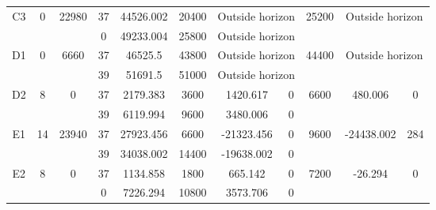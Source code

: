 \begin{table}
\begin{tabular}{c||c|c||c|c|c|c|c||c|c|c}
         &
        
      \\
      \hline
      \multirow{2}{*}{C3} &
      \multirow{2}{*}{0} &
      \multirow{2}{*}{22980} &
      37 &
      44526.002 &
      20400 &
        \multicolumn{2}{|c||}{Outside horizon} &
      \multirow{2}{*}{25200} &
        \multicolumn{2}{c}{\multirow{2}{*}{Outside horizon}}
      \\
      \cline{4-8}
       &
       &
       &
      0 &
      49233.004 &
      25800 &
        \multicolumn{2}{|c||}{Outside horizon} &
      
        
      \\
      \hline
      \multirow{2}{*}{D1} &
      \multirow{2}{*}{0} &
      \multirow{2}{*}{6660} &
      37 &
      46525.5 &
      43800 &
        \multicolumn{2}{|c||}{Outside horizon} &
      \multirow{2}{*}{44400} &
        \multicolumn{2}{c}{\multirow{2}{*}{Outside horizon}}
      \\
      \cline{4-8}
       &
       &
       &
      39 &
      51691.5 &
      51000 &
        \multicolumn{2}{|c||}{Outside horizon} &
      
        
      \\
      \hline
      \multirow{2}{*}{D2} &
      \multirow{2}{*}{8} &
      \multirow{2}{*}{0} &
      37 &
      2179.383 &
      3600 &
        1420.617 &
        0 &
      \multirow{2}{*}{6600} &
        \multirow{2}{*}{480.006} &
        \multirow{2}{*}{0}
      \\
      \cline{4-8}
       &
       &
       &
      39 &
      6119.994 &
      9600 &
        3480.006 &
        0 &
      
         &
        
      \\
      \hline
      \multirow{2}{*}{E1} &
      \multirow{2}{*}{14} &
      \multirow{2}{*}{23940} &
      37 &
      27923.456 &
      6600 &
        -21323.456 &
        0 &
      \multirow{2}{*}{9600} &
        \multirow{2}{*}{-24438.002} &
        \multirow{2}{*}{284}
      \\
      \cline{4-8}
       &
       &
       &
      39 &
      34038.002 &
      14400 &
        -19638.002 &
        0 &
      
         &
        
      \\
      \hline
      \multirow{2}{*}{E2} &
      \multirow{2}{*}{8} &
      \multirow{2}{*}{0} &
      37 &
      1134.858 &
      1800 &
        665.142 &
        0 &
      \multirow{2}{*}{7200} &
        \multirow{2}{*}{-26.294} &
        \multirow{2}{*}{0}
      \\
      \cline{4-8}
       &
       &
       &
      0 &
      7226.294 &
      10800 &
        3573.706 &
        0 &
      

\end{tabular}
\end{table}

